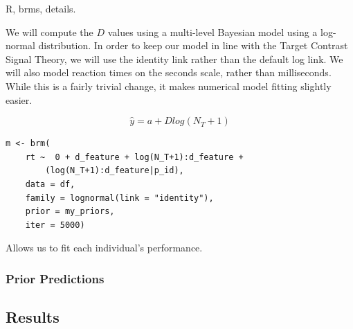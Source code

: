 \documentclass[smallextended]{svjour3}       %
\begin{document}
R, brms, details.

We will compute the $D$ values using a multi-level Bayesian model using a log-normal distribution. In order to keep our model in line with the Target Contrast Signal Theory, we will use the identity link rather than the default log link. We will also model reaction times on the seconds scale, rather than milliseconds. While this is a fairly trivial change, it makes numerical model fitting slightly easier. 

\begin{equation}
\hat{y} = a + Dlog(N_T + 1)
\label{eq:computeDlm}
\end{equation}

\begin{verbatim}
m <- brm(
    rt ~  0 + d_feature + log(N_T+1):d_feature + 
    	(log(N_T+1):d_feature|p_id),
    data = df,
    family = lognormal(link = "identity"),
    prior = my_priors,
    iter = 5000)
\end{verbatim}

Allows us to fit each individual's performance.


\subsubsection{Prior Predictions}

\subsection{Results}
\end{document}

